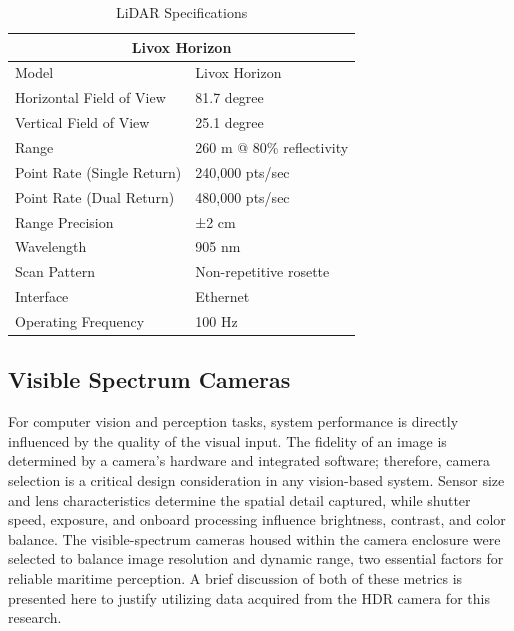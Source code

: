 \documentclass[../main.tex]{subfiles}
\begin{document}
\begin{table}[htpb]
\centering
\begin{tabular}{ll}
\hline
\multicolumn{2}{c}{Livox Horizon}\\
\hline
\hline
Model & Livox Horizon \\
Horizontal Field of View & 81.7 degree \\
Vertical Field of View & 25.1 degree \\
Range & 260 m @ 80\% reflectivity \\
Point Rate (Single Return) & 240,000 pts/sec \\
Point Rate (Dual Return) & 480,000 pts/sec \\
Range Precision & ±2 cm \\
Wavelength & 905 nm \\
Scan Pattern & Non-repetitive rosette \\
Interface & Ethernet \\
Operating Frequency & 100 Hz \\
\hline
\end{tabular}
\caption{LiDAR Specifications}
\label{table:livox_horizon_specs}
\end{table}

\subsection{Visible Spectrum Cameras} \label{visual_cameras}


For computer vision and perception tasks, system performance is directly influenced by the quality of the visual input.
The fidelity of an image is determined by a camera's hardware and integrated software; therefore, camera selection is a critical design consideration in any vision-based system. 
Sensor size and lens characteristics determine the spatial detail captured, while shutter speed, exposure, and onboard processing influence brightness, contrast, and color balance. 
The visible-spectrum cameras housed within the camera enclosure were selected to balance image resolution and dynamic range, two essential factors for reliable maritime perception.
A brief discussion of both of these metrics is presented here to justify utilizing data acquired from the \ac{HDR} camera for this research.
\end{document}
